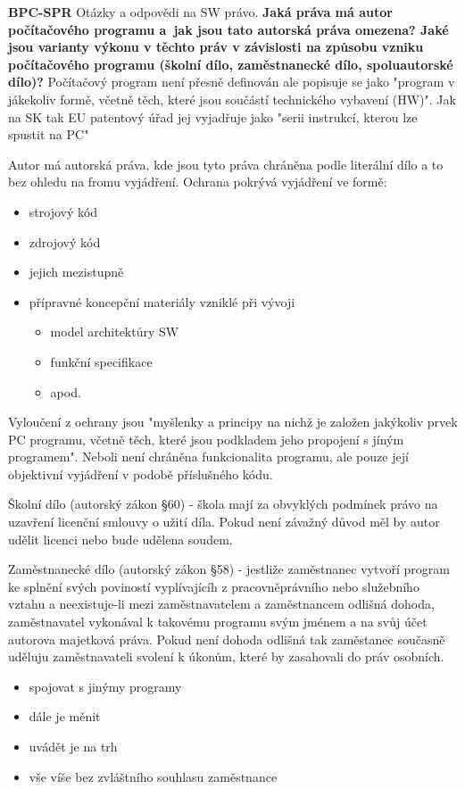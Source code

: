\documentclass[12pt,a4paper,czech]{report}
\newcommand{\nadpis}[1]{\noindent\textbf{\Large{#1}}\normalsize}
\newcommand{\nadpisM}[1]{\noindent\textbf{\Huge{#1}}\normalsize}
\begin{document}
\nadpisM{BPC-SPR}\newline
\newline
\newline
Otázky a odpovědi na SW právo.
\newline
\newline
\newline
\nadpis{Jaká práva má autor počítačového programu a~jak jsou tato autorská práva omezena? Jaké jsou varianty výkonu v těchto práv v závislosti na způsobu vzniku počítačového programu (školní dílo, zaměstnanecké dílo, spoluautorské dílo)?}
\newline
\newline
Počítačový program není přesně definován ale popisuje se jako "program v jákekoliv formě, včetně těch, které jsou součástí technického vybavení (HW)". Jak na SK tak EU patentový úřad jej vyjadřuje jako "serii instrukcí, kterou lze spustit na PC"

Autor má autorská práva, kde jsou tyto práva chráněna podle literální dílo a to bez ohledu na fromu vyjádření. \newline
Ochrana pokrývá vyjádření ve formě:
\begin{itemize}
    \item strojový kód
    \item zdrojový kód
    \item jejich mezistupně
    \item přípravné koncepční materiály vzniklé při vývoji
    \begin{itemize}
        \item model architektůry SW
        \item funkční specifikace
        \item apod.
    \end{itemize}
\end{itemize}
Vyloučení z ochrany jsou "myšlenky a principy na nichž je založen jakýkoliv prvek PC programu, včetně těch, které jsou podkladem jeho propojení s jíným programem". Neboli není chráněna funkcionalita programu, ale pouze její objektivní vyjádření v podobě příslušného kódu.


Školní dílo (autorský zákon §60) - škola mají za obvyklých podmínek právo na uzavření licenční smlouvy o užití díla. Pokud není závažný důvod měl by autor udělit licenci nebo bude udělena soudem.

Zaměstnanecké dílo (autorský zákon §58) - jestliže zaměstnanec vytvoří program ke splnění svých poviností vyplívajícíh z pracovněprávního nebo služebního vztahu a neexistuje-li mezi zaměstnavatelem a zaměstnancem odlišná dohoda, zaměstnavatel vykonával k takovému programu svým jménem a na svůj účet autorova majetková práva. Pokud není dohoda odlišná tak zaměstanec současně uděluju zaměstnavateli svolení k úkonům, které by zasahovali do práv osobních.
\begin{itemize}
    \item spojovat s jinýmy programy
    \item dále je měnit 
    \item uvádět je na trh
    \item vše víše bez zvláštního souhlasu zaměstnance
\end{itemize}
\end{document}

